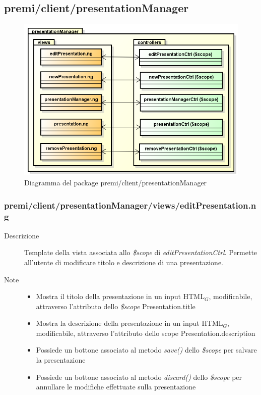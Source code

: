 \clearpage
\subsection{premi/client/presentationManager}
\begin{figure}[h]
\begin{center}
\includegraphics[scale=0.50]{img/diapkg/presentationManager.png}
\caption{Diagramma del package premi/client/presentationManager}
\end{center}
\end{figure}











\subsubsection{premi/client/presentationManager/views/editPresentation.ng}

\begin{description}
\item[Descrizione] \hfill
	Template della vista associata allo \textit{\$scope} di \textit{editPresentationCtrl}. Permette all'utente di modificare titolo e descrizione di una presentazione.
\item[Note] \hfill
	\begin{itemize}
			\item Mostra il titolo della presentazione in un input HTML$_G$, modificabile, attraverso l'attributo dello \textit{\$scope} Presentation.title
			\item Mostra la descrizione della presentazione in un input HTML$_G$, modificabile, attraverso l'attributo dello scope Presentation.description
			\item Possiede un bottone associato al metodo \textit{save()} dello \textit{\$scope} per salvare la presentazione
			\item Possiede un bottone associato al metodo \textit{discard()} dello \textit{\$scope} per annullare le modifiche effettuate sulla presentazione
	\end{itemize}
\end{description}

